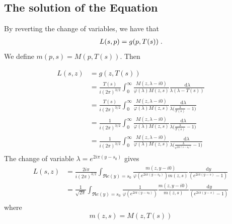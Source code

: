 \documentclass[11pt]{amsart}
\renewcommand{\Re}{\mathfrak{R}e}
\newcommand{\diff}{\,\mathrm{d}}
\begin{document}
\subsection{The solution of the Equation}
By reverting the change of variables, we have that 
\begin{align}
    L(s,p) = g(p, T(s)) 
    \; .
\end{align}
We define $m(p,s) = M(p, T(s))$. Then

\begin{align*}
    L(s,z) &= g(z,T(s)) \\ 
    &= 
    \frac{T(s)}{i(2\pi)^{3/2}}\int_0^\infty  \frac{M(z,\lambda-i0)}{\varphi(\lambda)M(z,s)} \frac{\diff \lambda}{\lambda(\lambda-T(s))} \\
    &= 
    \frac{T(s)}{i(2\pi)^{3/2}}\int_0^\infty  \frac{M(z,\lambda-i0)}{\varphi(\lambda)M(z,s)} \frac{\diff \lambda}{\lambda\Big(\frac{\lambda}{T(s)}-1\Big)} \\
    &= 
    \frac{1}{i(2\pi)^{3/2}}\int_0^\infty  \frac{M(z,\lambda-i0)}{\varphi(\lambda)M(z,s)} \frac{\diff \lambda}{\lambda\Big(\frac{\lambda}{T(s)}-1\Big)} \\
    &= 
    \frac{1}{i(2\pi)^{3/2}}\int_0^\infty  \frac{M(z,\lambda-i0)}{\varphi(\lambda)M(z,s)} \frac{\diff \lambda}{\lambda\Big(\frac{\lambda}{e^{2i\pi(s-s_0)}}-1\Big)} \\
\end{align*}
The change of variable $\lambda = e^{2i\pi(y-s_0)}$ gives
\begin{align*}
    L(s,z)
    &= 
    \frac{2i\pi}{i(2\pi)^{3/2}}\int_{\Re(y)=s_0}  \frac{m(z,y-i0)}{\varphi(e^{2i\pi(y-s_0)})m(z,s)} \frac{\diff y}{(e^{2i\pi(y-s)}-1)} \\
    &= 
    \frac{1}{\sqrt{2\pi}}\int_{\Re(y)=s_0} \frac{1}{\varphi(e^{2i\pi(y-s_0)})}  \frac{m(z,y-i0)}{m(z,s)} \frac{\diff y}{(e^{2i\pi(y-s)}-1)} \\
\end{align*}
where 
$$m(z,s) = M(z, T(s))$$



\end{document}
